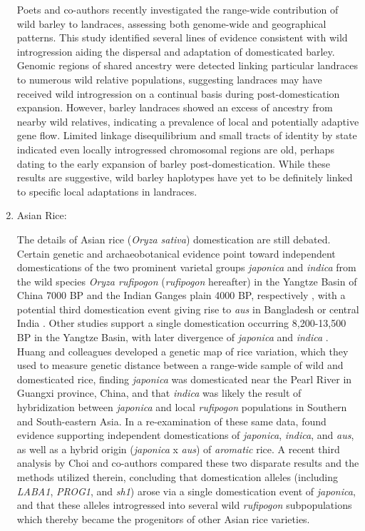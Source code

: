 \documentclass[11pt]{article}
\begin{document}
\begin{enumerate}
Poets and co-authors \cite{Poets2015} recently investigated the range-wide contribution of wild barley to landraces, assessing both genome-wide and geographical patterns.
This study identified several lines of evidence consistent with wild introgression aiding the dispersal and adaptation of domesticated barley.
Genomic regions of shared ancestry were detected linking particular landraces to numerous wild relative populations, suggesting landraces may have received wild introgression on a continual basis during post-domestication expansion.
However, barley landraces showed an excess of ancestry from nearby wild relatives, indicating a prevalence of local and potentially adaptive gene flow.
Limited linkage disequilibrium and small tracts of identity by state indicated even locally introgressed chromosomal regions are old, perhaps dating to the early expansion of barley  post-domestication.
While these results are suggestive, wild barley haplotypes have yet to be definitely linked to specific local adaptations in landraces.


\item{Asian Rice:}

The details of Asian rice (\emph{Oryza sativa}) domestication are still debated.
Certain genetic and archaeobotanical evidence point toward independent domestications of the two prominent varietal groups \emph{japonica} and \emph{indica} from the wild species \emph{Oryza rufipogon} (\emph{rufipogon} hereafter) in the Yangtze Basin of China 7000 BP and the Indian Ganges plain 4000 BP, respectively \cite{fuller2010consilience}, with a potential third domestication event giving rise to \emph{aus} in Bangladesh or central India \cite{civavn2015three}.
Other studies support a single domestication occurring 8,200-13,500 BP in the Yangtze Basin, with later divergence of \emph{japonica} and \emph{indica} \cite{molina2011molecular, Huang2012}.
Huang and colleagues \cite{Huang2012} developed a genetic map of rice variation, which they used to measure genetic distance between a range-wide sample of wild and domesticated rice, finding \emph{japonica} was domesticated near the Pearl River in Guangxi province, China, and that \emph{indica} was likely the result of hybridization between \emph{japonica} and local \emph{rufipogon} populations in Southern and South-eastern Asia.
In a re-examination of these same data, \cite{civavn2015three} found evidence supporting independent domestications of \emph{japonica}, \emph{indica}, and \emph{aus}, as well as a hybrid origin (\emph{japonica} x \emph{aus}) of \emph{aromatic} rice.
A recent third analysis by Choi and co-authors \cite{choi2018multiple} compared these two disparate results and the methods utilized therein, concluding that domestication alleles (including \emph{LABA1}, \emph{PROG1}, and \emph{sh1}) arose via a single domestication event of \emph{japonica}, and that these alleles introgressed into several wild \emph{rufipogon} subpopulations which thereby became the progenitors of other Asian rice varieties.


\end{enumerate}
\end{document}
